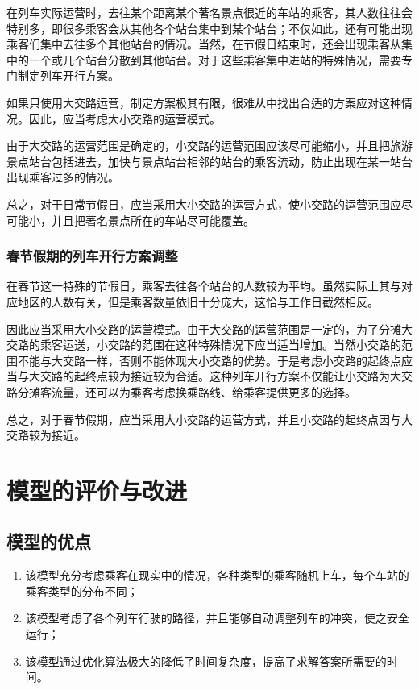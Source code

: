 在列车实际运营时，去往某个距离某个著名景点很近的车站的乘客，其人数往往会特别多，即很多乘客会从其他各个站台集中到某个站台；不仅如此，还有可能出现乘客们集中去往多个其他站台的情况。当然，在节假日结束时，还会出现乘客从集中的一个或几个站台分散到其他站台。对于这些乘客集中进站的特殊情况，需要专门制定列车开行方案。

如果只使用大交路运营，制定方案极其有限，很难从中找出合适的方案应对这种情况。因此，应当考虑大小交路的运营模式。

由于大交路的运营范围是确定的，小交路的运营范围应该尽可能缩小，并且把旅游景点站台包括进去，加快与景点站台相邻的站台的乘客流动，防止出现在某一站台出现乘客过多的情况。

总之，对于日常节假日，应当采用大小交路的运营方式，使小交路的运营范围应尽可能小，并且把著名景点所在的车站尽可能覆盖。

\subsubsection{春节假期的列车开行方案调整}

在春节这一特殊的节假日，乘客去往各个站台的人数较为平均。虽然实际上其与对应地区的人数有关，但是乘客数量依旧十分庞大，这恰与工作日截然相反。

因此应当采用大小交路的运营模式。由于大交路的运营范围是一定的，为了分摊大交路的乘客运送，小交路的范围在这种特殊情况下应当适当增加。当然小交路的范围不能与大交路一样，否则不能体现大小交路的优势。于是考虑小交路的起终点应当与大交路的起终点较为接近较为合适。这种列车开行方案不仅能让小交路为大交路分摊客流量，还可以为乘客考虑换乘路线、给乘客提供更多的选择。

总之，对于春节假期，应当采用大小交路的运营方式，并且小交路的起终点因与大交路较为接近。


%
%

\section{模型的评价与改进}

\subsection{模型的优点}

\begin{enumerate}
    \item 该模型充分考虑乘客在现实中的情况，各种类型的乘客随机上车，每个车站的乘客类型的分布不同；
    \item 该模型考虑了各个列车行驶的路径，并且能够自动调整列车的冲突，使之安全运行；
    \item 该模型通过优化算法极大的降低了时间复杂度，提高了求解答案所需要的时间。
\end{enumerate}

